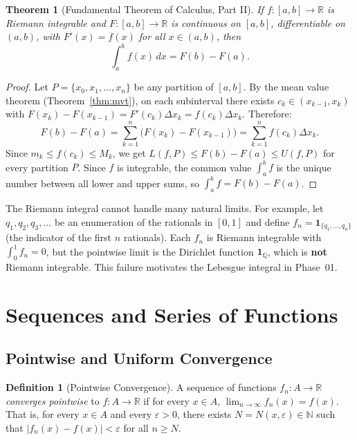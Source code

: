\documentclass[11pt,a4paper]{article}
\theoremstyle{definition}
\newtheorem{definition}{Definition}[section]
\theoremstyle{plain}
\newtheorem{theorem}{Theorem}[section]
\theoremstyle{remark}
\newcommand{\R}{\mathbb{R}}
\newcommand{\N}{\mathbb{N}}
\newcommand{\Q}{\mathbb{Q}}
\begin{document}
\begin{theorem}[Fundamental Theorem of Calculus, Part II]
\label{thm:ftc2}
If $f : [a, b] \to \R$ is Riemann integrable and $F : [a, b] \to \R$ is continuous
on $[a, b]$, differentiable on $(a, b)$, with $F'(x) = f(x)$ for all
$x \in (a, b)$, then
\[
\int_a^b f(x)\,dx = F(b) - F(a).
\]
\end{theorem}

\begin{proof}
Let $P = \{x_0, x_1, \ldots, x_n\}$ be any partition of $[a, b]$. By the mean
value theorem (Theorem~\ref{thm:mvt}), on each subinterval there exists
$c_k \in (x_{k-1}, x_k)$ with $F(x_k) - F(x_{k-1}) = F'(c_k)\Delta x_k =
f(c_k)\Delta x_k$. Therefore:
\[
F(b) - F(a) = \sum_{k=1}^n \bigl(F(x_k) - F(x_{k-1})\bigr)
= \sum_{k=1}^n f(c_k)\Delta x_k.
\]
Since $m_k \le f(c_k) \le M_k$, we get
$L(f, P) \le F(b) - F(a) \le U(f, P)$ for every partition $P$. Since $f$ is
integrable, the common value $\int_a^b f$ is the unique number between all lower
and upper sums, so $\int_a^b f = F(b) - F(a)$.
\end{proof}

\begin{warning}
The Riemann integral cannot handle many natural limits. For example, let
$q_1, q_2, q_3, \ldots$ be an enumeration of the rationals in $[0,1]$ and define
$f_n = \mathbf{1}_{\{q_1, \ldots, q_n\}}$ (the indicator of the first $n$
rationals). Each $f_n$ is Riemann integrable with $\int_0^1 f_n = 0$, but the
pointwise limit is the Dirichlet function $\mathbf{1}_\Q$, which is \textbf{not}
Riemann integrable. This failure motivates the Lebesgue integral in Phase~01.
\end{warning}

\section{Sequences and Series of Functions}
\label{sec:function_sequences}

\subsection{Pointwise and Uniform Convergence}
\label{subsec:pointwise_uniform}

\begin{definition}[Pointwise Convergence]
\label{def:pointwise}
A sequence of functions $f_n : A \to \R$ \emph{converges pointwise} to
$f : A \to \R$ if for every $x \in A$, $\lim_{n \to \infty} f_n(x) = f(x)$.
That is, for every $x \in A$ and every $\varepsilon > 0$, there exists
$N = N(x, \varepsilon) \in \N$ such that $|f_n(x) - f(x)| < \varepsilon$
for all $n \ge N$.
\end{definition}
\end{document}
